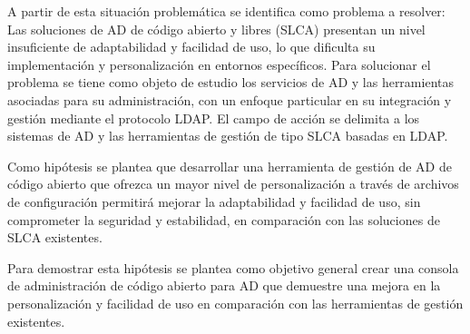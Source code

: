 A partir de esta situación problemática se identifica como problema a resolver: Las soluciones de AD de código abierto y libres (SLCA) presentan un nivel insuficiente de adaptabilidad y facilidad de uso, lo que dificulta su implementación y personalización en entornos específicos. Para solucionar el problema se tiene como objeto de estudio los servicios de AD y las herramientas asociadas para su administración, con un enfoque particular en su integración y gestión mediante el protocolo LDAP. El campo de acción se delimita a los sistemas de AD y las herramientas de gestión de tipo SLCA basadas en LDAP.

Como hipótesis se plantea que desarrollar una herramienta de gestión de AD de código abierto que ofrezca un mayor nivel de personalización a través de archivos de configuración permitirá mejorar la adaptabilidad y facilidad de uso, sin comprometer la seguridad y estabilidad, en comparación con las soluciones de SLCA existentes.

Para demostrar esta hipótesis se plantea como objetivo general crear una consola de administración de código abierto para AD que demuestre una mejora en la personalización y facilidad de uso en comparación con las herramientas de gestión existentes.






